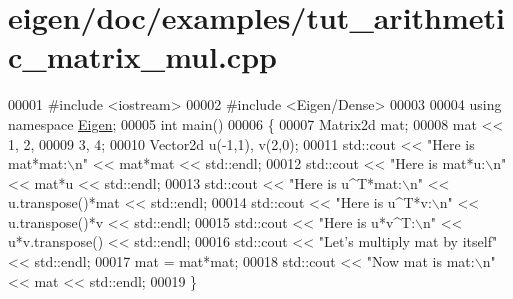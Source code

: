 \hypertarget{eigen_2doc_2examples_2tut__arithmetic__matrix__mul_8cpp_source}{}\section{eigen/doc/examples/tut\+\_\+arithmetic\+\_\+matrix\+\_\+mul.cpp}
\label{eigen_2doc_2examples_2tut__arithmetic__matrix__mul_8cpp_source}

\begin{DoxyCode}
00001 \textcolor{preprocessor}{#include <iostream>}
00002 \textcolor{preprocessor}{#include <Eigen/Dense>}
00003 
00004 \textcolor{keyword}{using namespace }\hyperlink{namespace_eigen}{Eigen};
00005 \textcolor{keywordtype}{int} main()
00006 \{
00007   Matrix2d mat;
00008   mat << 1, 2,
00009          3, 4;
00010   Vector2d u(-1,1), v(2,0);
00011   std::cout << \textcolor{stringliteral}{"Here is mat*mat:\(\backslash\)n"} << mat*mat << std::endl;
00012   std::cout << \textcolor{stringliteral}{"Here is mat*u:\(\backslash\)n"} << mat*u << std::endl;
00013   std::cout << \textcolor{stringliteral}{"Here is u^T*mat:\(\backslash\)n"} << u.transpose()*mat << std::endl;
00014   std::cout << \textcolor{stringliteral}{"Here is u^T*v:\(\backslash\)n"} << u.transpose()*v << std::endl;
00015   std::cout << \textcolor{stringliteral}{"Here is u*v^T:\(\backslash\)n"} << u*v.transpose() << std::endl;
00016   std::cout << \textcolor{stringliteral}{"Let's multiply mat by itself"} << std::endl;
00017   mat = mat*mat;
00018   std::cout << \textcolor{stringliteral}{"Now mat is mat:\(\backslash\)n"} << mat << std::endl;
00019 \}
\end{DoxyCode}

